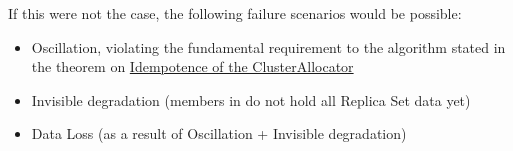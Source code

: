 If this were not the case, the following failure scenarios would be possible:
\begin{itemize}
  \item Oscillation, violating the fundamental requirement to the algorithm stated in the theorem on \hyperref[theorem:idempotence_clusterallocator]{Idempotence of the ClusterAllocator}
  \item Invisible degradation (members in  do not hold all Replica Set data yet)
  \item Data Loss (as a result of Oscillation + Invisible degradation)
\end{itemize}
